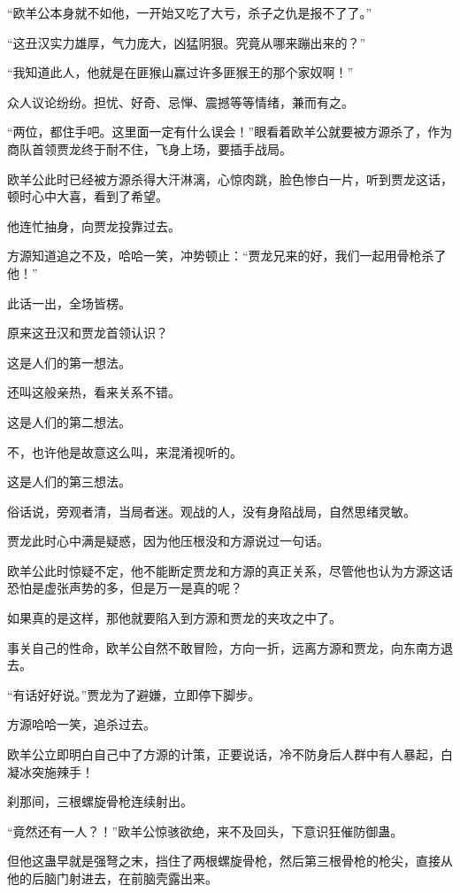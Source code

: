 \begin{this_body}
“欧羊公本身就不如他，一开始又吃了大亏，杀子之仇是报不了了。”

“这丑汉实力雄厚，气力庞大，凶猛阴狠。究竟从哪来蹦出来的？”

“我知道此人，他就是在匪猴山赢过许多匪猴王的那个家奴啊！”

众人议论纷纷。担忧、好奇、忌惮、震撼等等情绪，兼而有之。

“两位，都住手吧。这里面一定有什么误会！”眼看着欧羊公就要被方源杀了，作为商队首领贾龙终于耐不住，飞身上场，要插手战局。

欧羊公此时已经被方源杀得大汗淋漓，心惊肉跳，脸色惨白一片，听到贾龙这话，顿时心中大喜，看到了希望。

他连忙抽身，向贾龙投靠过去。

方源知道追之不及，哈哈一笑，冲势顿止：“贾龙兄来的好，我们一起用骨枪杀了他！”

此话一出，全场皆楞。

原来这丑汉和贾龙首领认识？

这是人们的第一想法。

还叫这般亲热，看来关系不错。

这是人们的第二想法。

不，也许他是故意这么叫，来混淆视听的。

这是人们的第三想法。

俗话说，旁观者清，当局者迷。观战的人，没有身陷战局，自然思绪灵敏。

贾龙此时心中满是疑惑，因为他压根没和方源说过一句话。

欧羊公此时惊疑不定，他不能断定贾龙和方源的真正关系，尽管他也认为方源这话恐怕是虚张声势的多，但是万一是真的呢？

如果真的是这样，那他就要陷入到方源和贾龙的夹攻之中了。

事关自己的性命，欧羊公自然不敢冒险，方向一折，远离方源和贾龙，向东南方退去。

“有话好好说。”贾龙为了避嫌，立即停下脚步。

方源哈哈一笑，追杀过去。

欧羊公立即明白自己中了方源的计策，正要说话，冷不防身后人群中有人暴起，白凝冰突施辣手！

刹那间，三根螺旋骨枪连续射出。

“竟然还有一人？！”欧羊公惊骇欲绝，来不及回头，下意识狂催防御蛊。

但他这蛊早就是强弩之末，挡住了两根螺旋骨枪，然后第三根骨枪的枪尖，直接从他的后脑门射进去，在前脑壳露出来。


\end{this_body}
